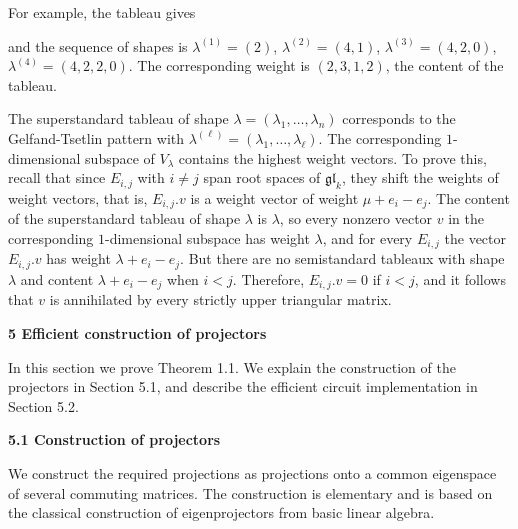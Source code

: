 \documentclass[10pt,a4paper]{article}
\begin{document}
For example, the tableau 
gives








and the sequence of shapes is $\lambda^{(1)}=(2)$, $\lambda^{(2)}=(4,1)$, $\lambda^{(3)}=(4,2,0)$, $\lambda^{(4)}=(4,2,2,0)$.
The corresponding weight is $(2,3,1,2)$, the content of the tableau.





The superstandard tableau of shape $\lambda=(\lambda_{1},\dots,\lambda_{n})$ corresponds to the Gelfand-Tsetlin pattern with $\lambda^{(\ell)}=(\lambda_{1},\dots,\lambda_{\ell})$.
The corresponding $1$-dimensional subspace of $V_{\lambda}$ contains the highest weight vectors.
To prove this, recall that since $E_{i,j}$ with $i\neq j$ span root spaces of $\mathfrak{gl}_{k}$, they shift the weights of weight vectors, that is, $E_{i,j}.v$ is a weight vector of weight $\mu+e_{i}-e_{j}$.
The content of the superstandard tableau of shape $\lambda$ is $\lambda$, so every nonzero vector $v$ in the corresponding $1$-dimensional subspace has weight $\lambda$, and for every $E_{i,j}$ the vector $E_{i,j}.v$ has weight $\lambda+e_{i}-e_{j}$. But there are no semistandard tableaux with shape $\lambda$ and content $\lambda+e_{i}-e_{j}$ when $i<j$.
Therefore, $E_{i,j}.v=0$ if $i<j$, and it follows that $v$ is annihilated by every strictly upper triangular matrix.







\par\medskip\noindent\textbf{5 Efficient construction of projectors}\par




In this section we prove Theorem 1.1.
We explain the construction of the projectors in Section 5.1, and describe the efficient circuit implementation in Section 5.2.





\par\medskip\noindent\textbf{5.1 Construction of projectors}\par




We construct the required projections as projections onto a common eigenspace of several commuting matrices. The construction is elementary and is based on the classical construction of eigenprojectors from basic linear algebra.
\end{document}
